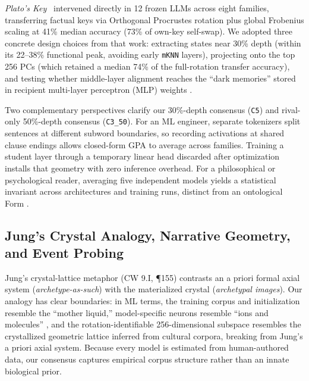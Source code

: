 \documentclass[conference]{IEEEtran}
\begin{document}
\textit{Plato's Key}~\cite{cheng2026platoskey} intervened directly in 12 frozen LLMs across eight families, transferring factual keys via Orthogonal Procrustes rotation plus global Frobenius scaling at 41\% median accuracy (73\% of own-key self-swap). We adopted three concrete design choices from that work: extracting states near 30\% depth (within its 22--38\% functional peak, avoiding early \texttt{mKNN} layers), projecting onto the top 256 PCs (which retained a median 74\% of the full-rotation transfer accuracy), and testing whether middle-layer alignment reaches the ``dark memories'' stored in recipient multi-layer perceptron (MLP) weights \cite{cheng2026platoskey}.

Two complementary perspectives clarify our 30\%-depth consensus (\texttt{C5}) and rival-only 50\%-depth consensus (\texttt{C3\_50}). For an ML engineer, separate tokenizers split sentences at different subword boundaries, so recording activations at shared clause endings allows closed-form GPA \cite{gower1975gpa,cheng2026platoskey} to average across families. Training a student layer through a temporary linear head discarded after optimization installs that geometry with zero inference overhead. For a philosophical or psychological reader, averaging five independent models yields a statistical invariant across architectures and training runs, distinct from an ontological Form \cite{plato1892dialogues}.

\subsection{Jung's Crystal Analogy, Narrative Geometry, and Event Probing}
Jung's crystal-lattice metaphor \cite{jung1968archetypes} (CW 9.I, \P155) contrasts an a priori formal axial system (\textit{archetype-as-such}) with the materialized crystal (\textit{archetypal images}). Our analogy has clear boundaries: in ML terms, the training corpus and initialization resemble the ``mother liquid,'' model-specific neurons resemble ``ions and molecules'' \cite{gurnee2024universal}, and the rotation-identifiable 256-dimensional subspace \cite{cheng2026platoskey,balestriero2026proving} resembles the crystallized geometric lattice inferred from cultural corpora, breaking from Jung's a priori axial system. Because every model is estimated from human-authored data, our consensus captures empirical corpus structure rather than an innate biological prior.
\end{document}
